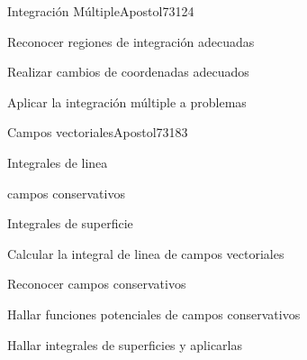 \begin{syllabus}
\begin{unit}{Integración Múltiple}{}{Apostol73}{12}{4}
   \begin{learningoutcomes}
      \item Reconocer regiones de integración adecuadas
      \item Realizar cambios de coordenadas adecuados
      \item Aplicar la integración múltiple a problemas
      \end{learningoutcomes}
\end{unit}

\begin{unit}{Campos vectoriales}{}{Apostol73}{18}{3}
   \begin{topics}
      \item Integrales de linea
      \item campos conservativos
      \item Integrales de superficie
   \end{topics}

   \begin{learningoutcomes}
      \item Calcular la integral de linea de campos vectoriales
      \item Reconocer campos conservativos
      \item Hallar funciones potenciales de campos conservativos
      \item Hallar integrales de superficies y aplicarlas
      \end{learningoutcomes}
\end{unit}

\begin{coursebibliography}
\end{coursebibliography}

\end{syllabus}
